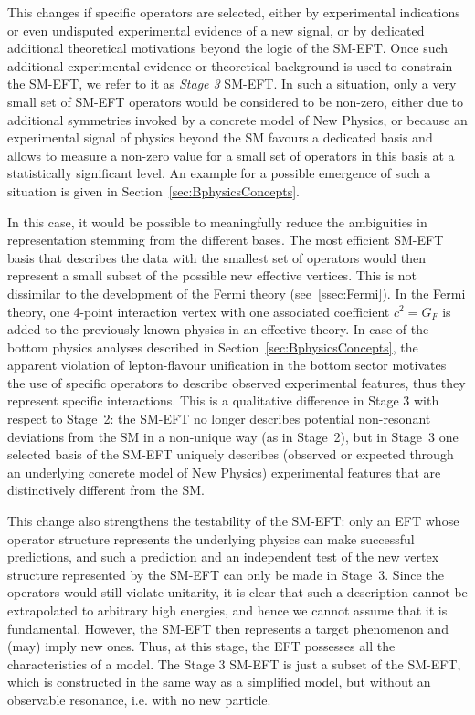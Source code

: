 This changes if specific operators are selected, either by
experimental indications or even undisputed experimental evidence of a
new signal, or by dedicated additional theoretical motivations beyond
the logic of the SM-EFT. Once such additional experimental evidence or
theoretical background is used to constrain the SM-EFT, we refer to it
as \emph{Stage 3} SM-EFT.  In such a situation, only a very small set
of SM-EFT operators would be considered to be non-zero, either due to
additional symmetries invoked by a concrete model of New Physics, or
because an experimental signal of physics beyond the SM favours a
dedicated basis and allows to measure a non-zero value for a small set
of operators in this basis at a statistically
significant level. An example for a possible emergence of such a
situation is given in Section~\ref{sec:BphysicsConcepts}.

In this case, it would be possible to meaningfully reduce the
ambiguities in representation stemming from the different bases. The
most efficient SM-EFT basis that describes the data with the
smallest set of operators would then represent a small subset of the
possible new effective vertices.  This is not dissimilar to the
development of the Fermi theory (see~\ref{ssec:Fermi}). In the Fermi
theory, one 4-point interaction vertex with one associated coefficient
$c^2=G_F$ is added to the previously known physics in an effective
theory. In case of the bottom physics analyses described in Section~\ref{sec:BphysicsConcepts}, the apparent
violation of lepton-flavour unification in the bottom sector motivates
the use of specific operators to describe observed experimental
features, thus they represent specific interactions. This is a
qualitative difference in Stage 3 with respect to Stage~2: the SM-EFT
no longer describes potential non-resonant deviations from the
SM in a non-unique way (as in Stage~2), but in Stage~3 one selected basis of
the SM-EFT uniquely describes (observed or expected through an
underlying concrete model of New Physics) experimental features that
are distinctively different from the SM.

This change also strengthens the testability of the SM-EFT: only an
EFT whose operator structure represents the underlying physics can
make successful predictions, and such a prediction and an independent
test of the new vertex structure represented by the SM-EFT can only be
made in Stage~3.  Since the operators would still violate unitarity,
it is clear that such a description cannot be extrapolated to
arbitrary high energies, and hence
we cannot assume that it is fundamental. However, the SM-EFT then
represents a target phenomenon and (may) imply new ones.  Thus, at this
stage, the EFT possesses all the characteristics of a model.
The Stage 3 SM-EFT is just a subset of the SM-EFT, which is constructed in the same way as a simplified model, but without an observable resonance, i.e. with no new particle.

